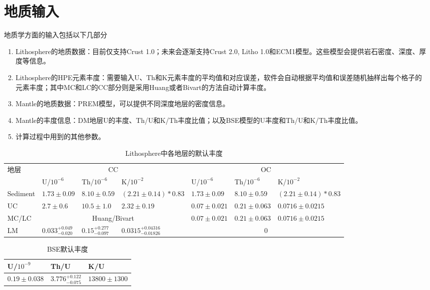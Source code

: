 		\section{地质输入}
			地质学方面的输入包括以下几部分
				\begin{enumerate}
					\item Lithosphere的地质数据：目前仅支持Crust 1.0；未来会逐渐支持Crust 2.0, Litho 1.0和ECM1模型。这些模型会提供岩石密度、深度、厚度等信息。
					\item Lithosphere的HPE元素丰度：需要输入U、Th和K元素丰度的平均值和对应误差，软件会自动根据平均值和误差随机抽样出每个格子的元素丰度；其中MC和LC的CC部分则是采用Huang或者Bivart的方法自动计算丰度。
					\item Mantle的地质数据：PREM模型，可以提供不同深度地层的密度信息。
					\item Mantle的丰度信息：DM地层U的丰度、Th/U和K/Th丰度比值；以及BSE模型的U丰度和Th/U和K/Th丰度比值。
					\item 计算过程中用到的其他参数。
				\end{enumerate}
				\begin{table}[H]
					\centering
					\caption{Lithosphere中各地层的默认丰度}
					\renewcommand{\arraystretch}{1.2} %
					\begin{tabular}{p{1.5cm}|p{2cm}p{2cm}p{3cm}|p{2cm}p{2cm}p{3cm}}
						\hline
						\hline
						\multirow{2}{*}{地层} & \multicolumn{3}{c|}{CC} & \multicolumn{3}{c}{OC} \\  
						\cline{2-7}
						& U/$10^{-6}$ & Th/$10^{-6}$ & K/$10^{-2}$ & U/$10^{-6}$ & Th/$10^{-6}$ & K/$10^{-2}$\\
						\hline
						Sediment & $1.73\pm 0.09$ & $8.10\pm 0.59$ & $(2.21 \pm 0.14)* 0.83$ & $1.73 \pm 0.09$ & $8.10 \pm 0.59$ & $(2.21 \pm 0.14) * 0.83$\\
						\hline
						UC & $2.7 \pm 0.6$ & $10.5 \pm 1.0$ & $2.32 \pm 0.19$ & $0.07\pm 0.021$ & $0.21 \pm 0.063$ & $0.0716 \pm 0.0215$\\
						\hline
						MC/LC & \multicolumn{3}{c|}{Huang/Bivart} & $0.07 \pm 0.021$ & $0.21 \pm 0.063$ & $0.0716 \pm 0.0215$ \\
						\hline
						LM & $0.033^{+0.049}_{-0.020}$ & $0.15^{+0.277}_{-0.097}$ & $0.0315^{+0.04316}_{-0.01826}$ & \multicolumn{3}{c}{$0$} \\
						\hline
						\hline
					\end{tabular}
					\label{Table: Lithosphere Default Abundance Input}
				\end{table}
				\begin{table}[H]
					\centering
					\caption{BSE默认丰度}
					\begin{tabular}{p{3cm}p{3cm}p{3cm}}
						\hline
						\hline
						U/$10^{-9}$ & Th/U & K/U\\
						\hline
						$0.19 \pm 0.038$ & $3.776^{+0.122}_{-0.075}$ & $13800 \pm 1300$\\
						\hline
						\hline
					\end{tabular}
					\label{Table: BSE Default Abundance Input}
				\end{table}
